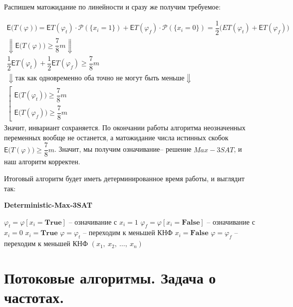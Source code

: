 \documentclass[a4paper,12pt]{article}
\renewcommand{\P}{\mathcal{P}}
\newcommand{\E}{\mathsf{E}}
\begin{document}
Распишем матожидание по линейности и сразу же получим требуемое:

\begin{gather*}
    \E\big(T(\varphi)\big) = \E T(\varphi_t)\cdot \P(\{x_i = 1\}) + \E T(\varphi_f)\cdot \P(\{x_i = 0\}) = \dfrac{1}{2}\Big(E T(\varphi_t) + \E T(\varphi_f)\Big) \\
    \Downarrow \E\big(T(\varphi)\big) \geqslant \dfrac{7}{8}m \Downarrow\\
    \dfrac{1}{2}\E T(\varphi_t) + \dfrac{1}{2}\E T(\varphi_f) \geqslant \dfrac{7}{8}m \\
    \Downarrow\text{так как одновременно оба точно не могут быть меньше}\Downarrow
    \\ \left[\begin{gathered}\E \big(T(\varphi_t)\big) \geqslant \dfrac{7}{8}m \\ \E \big(T(\varphi_f)\big)\geqslant \dfrac{7}{8}m\end{gathered}\right.
\end{gather*}
Значит, инвариант сохраняется. По окончании работы алгоритма неозначенных переменных вообще не останется, а матожидание числа истинных скобок $ \E\big(T(\varphi)\big) \geqslant \dfrac{7}{8}m$. Значит, мы получим означивание-- решение $Max-3SAT$, и наш алгоритм корректен.

Итоговый алгоритм будет иметь детерминированное время работы, и выглядит так:

\begin{algorithm}[H]
    \caption{\textbf{Deterministic-Max-3SAT}}
    \begin{algorithmic}[1]
        \Statex
            \State $\varphi_t = \varphi[x_i = \textbf{True}]$ -- означивание с $x_i = 1$
            \State $\varphi_f = \varphi[x_i = \textbf{False}]$ -- означивание с $x_i = 0$
            \If{$\E \big(T(\varphi_t)\big) \geqslant \E \big(T(\varphi_f)\big)$}
                \State $x_i = \textbf{True}$
                \State $\varphi = \varphi_t$ -- переходим к меньшей КНФ
            \Else
                \State $x_i = \textbf{False}$
                \State $\varphi = \varphi_f$ -- переходим к меньшей КНФ
            \EndIf
        \EndFor
        \State \Return $(x_1,\ x_2,\ \ldots,\ x_n)$
    \end{algorithmic}
\end{algorithm}

\newpage
\section{Потоковые алгоритмы. Задача о частотах.}
\end{document}
